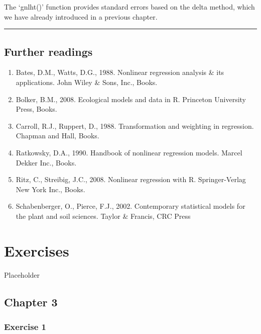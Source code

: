 \documentclass[a4paper,12pt,oneside]{book}
\providecommand{\tightlist}{%
  \setlength{\itemsep}{0pt}\setlength{\parskip}{0pt}}
\begin{document}
The `gnlht()' function provides standard errors based on the delta method, which we have already introduced in a previous chapter.

\begin{center}\rule{0.5\linewidth}{0.5pt}\end{center}

\hypertarget{further-readings-11}{%
\section{Further readings}\label{further-readings-11}}

\begin{enumerate}
\def\labelenumi{\arabic{enumi}.}
\tightlist
\item
  Bates, D.M., Watts, D.G., 1988. Nonlinear regression analysis \& its applications. John Wiley \& Sons, Inc., Books.
\item
  Bolker, B.M., 2008. Ecological models and data in R. Princeton University Press, Books.
\item
  Carroll, R.J., Ruppert, D., 1988. Transformation and weighting in regression. Chapman and Hall, Books.
\item
  Ratkowsky, D.A., 1990. Handbook of nonlinear regression models. Marcel Dekker Inc., Books.
\item
  Ritz, C., Streibig, J.C., 2008. Nonlinear regression with R. Springer-Verlag New York Inc., Books.
\item
  Schabenberger, O., Pierce, F.J., 2002. Contemporary statistical models for the plant and soil sciences. Taylor \& Francis, CRC Press
\end{enumerate}

\hypertarget{exercises}{%
\chapter{Exercises}\label{exercises}}

Placeholder

\hypertarget{chapter-3}{%
\section{Chapter 3}\label{chapter-3}}

\hypertarget{exercise-1}{%
\subsection{Exercise 1}\label{exercise-1}}
\end{document}
